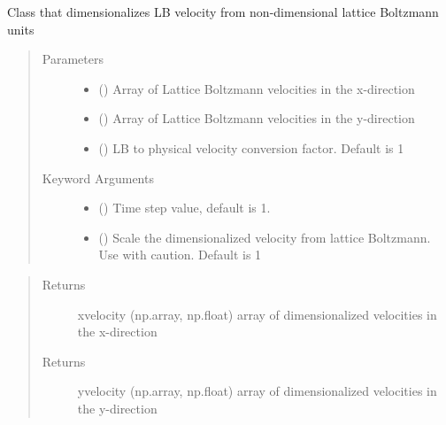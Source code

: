 \documentclass[letterpaper,10pt,english]{sphinxmanual}
\begin{document}
\begin{fulllineitems}
\label{\detokenize{index:lb_colloids.Colloids.Colloid_Math.Velocity}}
Class that dimensionalizes LB velocity from non-dimensional lattice Boltzmann units
\begin{quote}\begin{description}
\item[{Parameters}] \leavevmode\begin{itemize}
\item {} 
 () \textendash{} Array of Lattice Boltzmann velocities in the x-direction

\item {} 
 () \textendash{} Array of Lattice Boltzmann velocities in the y-direction

\item {} 
 () \textendash{} LB to physical velocity conversion factor. Default is 1

\end{itemize}

\item[{Keyword Arguments}] \leavevmode\begin{itemize}
\item {} 
 () \textendash{} Time step value, default is 1.

\item {} 
 () \textendash{} Scale the dimensionalized velocity from lattice Boltzmann. Use with caution. Default is 1

\end{itemize}

\end{description}\end{quote}
\begin{quote}\begin{description}
\item[{Returns}] \leavevmode
xvelocity (np.array, np.float) array of dimensionalized velocities in the x-direction

\item[{Returns}] \leavevmode
yvelocity (np.array, np.float) array of dimensionalized velocities in the y-direction

\end{description}\end{quote}

\end{fulllineitems}
\end{document}
